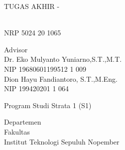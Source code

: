 \begin{large}
  TUGAS AKHIR - \coursecode{}
\end{large}

\vspace{\fill}

\begin{spacing}{1.5}
  \begin{Large}
    \tatitle
  \end{Large}
\end{spacing}

\vspace{\fill}

\begin{large}
  \name \\
  \textmd{NRP 5024 20 1065}
\end{large}

\vspace{\fill}

\begin{large}
  \textmd{Advisor} \\
  Dr. Eko Mulyanto Yuniarno,S.T.,M.T.\\
  \textmd{NIP 19680601199512 1 009} \\
  Dion Hayu Fandiantoro, S.T.,M.Eng. \\
  \textmd{NIP 199420201 1 064}
\end{large}

\vspace{\fill}

Program Studi Strata 1 (S1) \studyprogram{} \\

\mdseries

Departemen \department{} \\
Fakultas \faculty{} \\
Institut Teknologi Sepuluh Nopember

\place{} \\ \the\year{}
